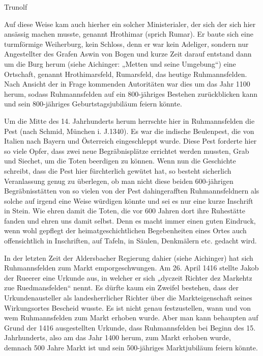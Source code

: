 \documentclass[12pt,a4paper]{book}
\begin{document}
Trunolf


Auf diese Weise kam auch hierher ein solcher Ministerialer, der sich der sich
hier ansässig machen musste, genannt Hrothimar (sprich Rumar). Er baute sich
eine turmförmige Weiherburg, kein Schloss, denn er war kein Adeliger, sondern
nur Angestellter des Grafen Aswin von Bogen und kurze Zeit darauf entstand dann
um die Burg herum (siehe Aichinger: „Metten und seine Umgebung“) eine Ortschaft,
genannt Hrothimarsfeld, Rumarsfeld, das heutige Ruhmannsfelden. Nach Ansicht der
in Frage kommenden Autoritäten war dies um das Jahr 1100 herum, sodass
Ruhmannsfelden auf ein 800-jähriges Bestehen zurückblicken kann und sein
800-jähriges Geburtstagsjubiläum feiern könnte.

Um die Mitte des 14. Jahrhunderts herum herrschte hier in Ruhmannsfelden die
Pest (nach Schmid, München i. J.1340). Es war die indische Beulenpest, die von
Italien nach Bayern und Österreich eingeschleppt wurde. Diese Pest forderte hier
so viele Opfer, dass zwei neue Begräbnisplätze errichtet werden mussten, Grab
und Siechet, um die Toten beerdigen zu können. Wenn nun die Geschichte schreibt,
dass die Pest hier fürchterlich gewütet hat, so besteht sicherlich Veranlassung
genug zu überlegen, ob man nicht diese beiden 600-jährigen Begräbnisstätten von
so vielen von der Pest dahingerafften Ruhmannsfeldnern als solche auf irgend
eine Weise würdigen könnte und sei es nur eine kurze Inschrift in Stein. Wie
ehren damit die Toten, die vor 600 Jahren dort ihre Ruhestätte fanden und ehren
uns damit selbst. Denn es macht immer einen guten Eindruck, wenn wohl gepflegt
der heimatgeschichtlichen Begebenheiten eines Ortes auch offensichtlich in
Inschriften, auf Tafeln, in Säulen, Denkmälern etc. gedacht wird.

In der letzten Zeit der Aldersbacher Regierung dahier (siehe Aichinger) hat sich
Ruhmannsfelden zum Markt emporgeschwungen. Am 26. April 1416 stellte Jakob der
Rueerer eine Urkunde aus, in welcher er sich „dyczeit Richter dez Markehtz zue
Ruedmansfelden“ nennt. Es dürfte kaum ein Zweifel bestehen, dass der
Urkundenausteller als landesherrlicher Richter über die Markteigenschaft seines
Wirkungsortes Bescheid wusste. Es ist nicht genau festzustellen, wann und von
wem Ruhmannsfelden zum Markt erhoben wurde. Aber man kann behaupten auf Grund
der 1416 ausgestellten Urkunde, dass Ruhmannsfelden bei Beginn des 15.
Jahrhunderts, also am das Jahr 1400 herum, zum Markt erhoben wurde, demnach 500
Jahre Markt ist und sein 500-jähriges Marktjubiläum feiern könnte.
\end{document}
